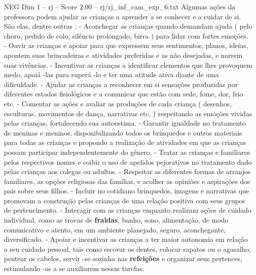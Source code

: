 \begin{textsample}{NEG Dim 1 – rj – Score 2.00 – rj/rj\_inf\_cam\_exp\_6.txt}
Algumas ações da professora podem ajudar as crianças a aprender a se conhecer e a cuidar de si.
São elas, dentre outras : - Aconchegar as crianças quando demandam ajuda ( pelo choro, pedido de colo, silêncio prolongado, birra ) para lidar com fortes emoções. - Ouvir as crianças e apoiar para que expressem seus sentimentos, planos, ideias, apontem suas brincadeiras e atividades preferidas e as não desejadas, e narrem suas vivências. - Incentivar as crianças a identificar elementos que lhes provoquem medo, apoiá -las para superá -lo e ter uma atitude ativa diante de uma dificuldade. - Ajudar as crianças a reconhecer em si sensações produzidas por diferentes estados fisiológicos e a comunicar que estão com sede, fome, dor, frio etc. - Comentar as ações e avaliar as produções de cada criança ( desenhos, esculturas, movimentos de dança, narrativas etc. ) respeitando as emoções vividas pelas crianças, fortalecendo sua autoestima. - Garantir igualdade no tratamento de meninas e meninos, disponibilizando todos os brinquedos e outros materiais para todas as crianças e propondo a realização de atividades em que as crianças possam participar independentemente do gênero. - Tratar as crianças e familiares pelos respectivos nomes e coibir o uso de apelidos pejorativos no tratamento dado pelas crianças aos colegas ou adultos. - Respeitar as diferentes formas de arranjos familiares, as opções religiosas das famílias, e acolher as opiniões e aspirações dos pais sobre seus filhos. - Incluir no cotidiano brinquedos, imagens e narrativas que promovam a construção pelas crianças de uma relação positiva com seus grupos de pertencimento. - Interagir com as crianças enquanto realizam ações de cuidado individual, como as trocas de \textbf{fraldas}, banho, sono, alimentação, de modo comunicativo e atento, em um ambiente planejado, seguro, aconchegante, diversificado. - Apoiar e incentivar as crianças a ter maior autonomia em relação a seu cuidado pessoal, tais como escovar os dentes, colocar sapatos ou o agasalho, pentear os cabelos, servir -se sozinha nas \textbf{refeições} e organizar seus pertences, estimulando -as a se auxiliarem nessas tarefas.

\end{textsample}
